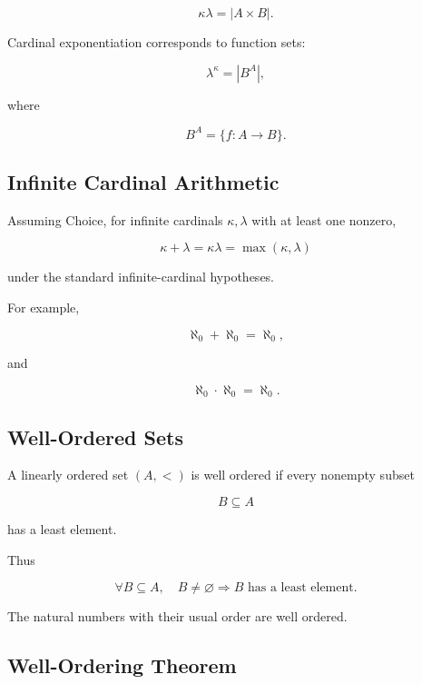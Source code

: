 \[
\boxed{
\kappa\lambda
=
|A\times B|.
}
\]

Cardinal exponentiation corresponds to function sets:

\[
\boxed{
\lambda^\kappa
=
|B^A|,
}
\]

where

\[
B^A
=
\{f:A\to B\}.
\]

\subsection{Infinite Cardinal Arithmetic}
\label{subsec:infinite-cardinal-arithmetic}

Assuming Choice, for infinite cardinals \(\kappa,\lambda\) with at least one
nonzero,

\[
\boxed{
\kappa+\lambda
=
\kappa\lambda
=
\max(\kappa,\lambda)
}
\]

under the standard infinite-cardinal hypotheses.

For example,

\[
\boxed{
\aleph_0+\aleph_0
=
\aleph_0,
}
\]

and

\[
\boxed{
\aleph_0\cdot\aleph_0
=
\aleph_0.
}
\]

\subsection{Well-Ordered Sets}
\label{subsec:well-ordered-sets}

A linearly ordered set \((A,<)\) is well ordered if every nonempty subset

\[
B\subseteq A
\]

has a least element.

Thus

\[
\boxed{
\forall B
\subseteq
A,
\quad
B\neq\varnothing
\Longrightarrow
B
\text{ has a least element}.
}
\]

The natural numbers with their usual order are well ordered.

\subsection{Well-Ordering Theorem}
\label{subsec:well-ordering-theorem}

